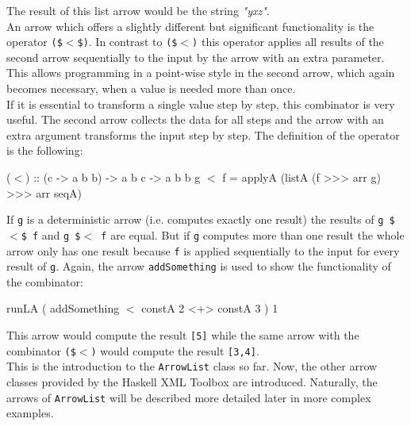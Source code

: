 \documentclass[11pt,a4paper,headsepline, bibtotoc]{scrreprt}
\begin{document}
The result of this list arrow would be the string \textit{"yxz"}.\\
An arrow which offers a slightly different but significant functionality is the operator \texttt{(\$$<$\$)}. In contrast to \texttt{(\$$<$)} this operator applies all results of the second arrow sequentially to the input by the arrow with an extra parameter. This allows programming in a point-wise style in the second arrow, which again becomes necessary, when a value is needed more than once.\\
If it is essential to transform a single value step by step, this combinator is very useful. The second arrow collects the data for all steps and the arrow with an extra argument transforms the input step by step. The definition of the operator is the following:
\begin{code}
($<$) :: (c -> a b b) -> a b c -> a b b
g $<$ f = applyA (listA (f >>> arr g) >>> arr seqA)
\end{code}
If \texttt{g} is a deterministic arrow (i.e. computes exactly one result) the results of \texttt{g \$$<$\$ f} and \texttt{g \$$<$ f} are equal. But if \texttt{g} computes more than one result the whole arrow only has one result because \texttt{f} is applied sequentially to the input for every result of \texttt{g}. Again, the arrow \texttt{addSomething} is used to show the functionality of the combinator:
\begin{code}
runLA ( addSomething $<$ constA 2 <+> constA 3 ) 1 
\end{code}
This arrow would compute the result \texttt{[5]} while the same arrow with the combinator \texttt{(\$$<$)} would compute the result \texttt{[3,4]}.\\
This is the introduction to the \texttt{ArrowList} class so far. Now, the other arrow classes provided by the Haskell XML Toolbox are introduced. Naturally, the arrows of \texttt{ArrowList} will be described more detailed later in more complex examples.
\end{document}
